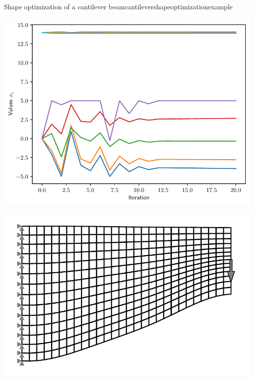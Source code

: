 \begin{example}{Shape optimization of a cantilever beam}{cantilevershapeoptimizationexample}
    \begin{minipage}{.5\textwidth}
        \centering
        \includegraphics[width=0.9\linewidth]{figures/cantilever_fem_shape_variables.pdf}
    \end{minipage}%
    \begin{minipage}{.5\textwidth}
        \centering
        \includegraphics[width=0.9\linewidth]{figures/cantilever_fem_shape.pdf}
    \end{minipage}
       
\end{example}



 